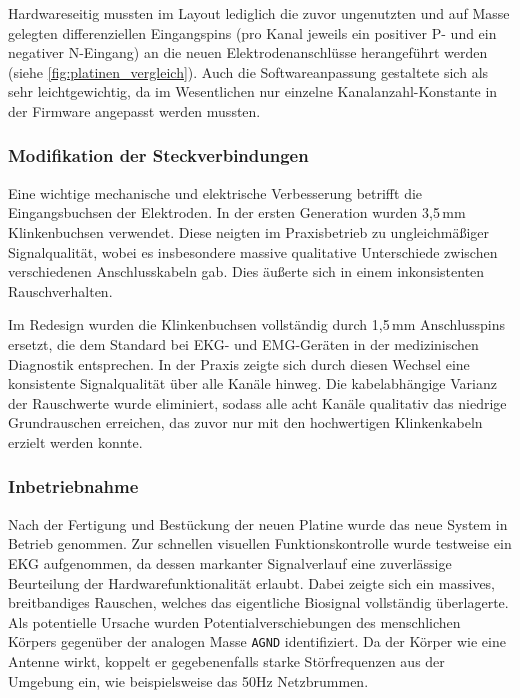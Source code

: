         Hardwareseitig mussten im Layout lediglich die zuvor ungenutzten und auf Masse gelegten differenziellen Eingangspins (pro Kanal jeweils ein positiver P- und ein negativer N-Eingang) an die neuen Elektrodenanschlüsse herangeführt werden (siehe \autoref{fig:platinen_vergleich}). Auch die Softwareanpassung gestaltete sich als sehr leichtgewichtig, da im Wesentlichen nur einzelne Kanalanzahl-Konstante in der Firmware angepasst werden mussten.

        \subsubsection{Modifikation der Steckverbindungen}
        Eine wichtige mechanische und elektrische Verbesserung betrifft die Eingangsbuchsen der Elektroden. In der ersten Generation wurden 3,5\,mm Klinkenbuchsen verwendet. Diese neigten im Praxisbetrieb zu ungleichmäßiger Signalqualität, wobei es insbesondere massive qualitative Unterschiede zwischen verschiedenen Anschlusskabeln gab. Dies äußerte sich in einem inkonsistenten Rauschverhalten.

        Im Redesign wurden die Klinkenbuchsen vollständig durch 1,5\,mm Anschlusspins ersetzt, die dem Standard bei \acs{EKG}- und \acs{EMG}-Geräten in der medizinischen Diagnostik entsprechen. In der Praxis zeigte sich durch diesen Wechsel eine konsistente Signalqualität über alle Kanäle hinweg. Die kabelabhängige Varianz der Rauschwerte wurde eliminiert, sodass alle acht Kanäle qualitativ das niedrige Grundrauschen erreichen, das zuvor nur mit den hochwertigen Klinkenkabeln erzielt werden konnte.

        \subsubsection{Inbetriebnahme}
        Nach der Fertigung und Bestückung der neuen Platine wurde das neue System in Betrieb genommen. Zur schnellen visuellen Funktionskontrolle wurde testweise ein \ac{EKG} aufgenommen, da dessen markanter Signalverlauf eine zuverlässige Beurteilung der Hardwarefunktionalität erlaubt. Dabei zeigte sich ein massives, breitbandiges Rauschen, welches das eigentliche Biosignal vollständig überlagerte. Als potentielle Ursache wurden Potentialverschiebungen des menschlichen Körpers gegenüber der analogen Masse \texttt{AGND} identifiziert. Da der Körper wie eine Antenne wirkt, koppelt er gegebenenfalls starke Störfrequenzen aus der Umgebung ein, wie beispielsweise das 50Hz Netzbrummen.

